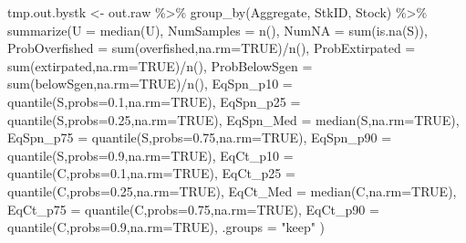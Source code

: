 \documentclass[french,11pt]{book}
\newenvironment{Shaded}{\begin{snugshade}}{\end{snugshade}}
\newcommand{\AttributeTok}[1]{\textcolor[rgb]{0.77,0.63,0.00}{#1}}
\newcommand{\ConstantTok}[1]{\textcolor[rgb]{0.00,0.00,0.00}{#1}}
\newcommand{\FloatTok}[1]{\textcolor[rgb]{0.00,0.00,0.81}{#1}}
\newcommand{\FunctionTok}[1]{\textcolor[rgb]{0.00,0.00,0.00}{#1}}
\newcommand{\NormalTok}[1]{#1}
\newcommand{\OtherTok}[1]{\textcolor[rgb]{0.56,0.35,0.01}{#1}}
\newcommand{\SpecialCharTok}[1]{\textcolor[rgb]{0.00,0.00,0.00}{#1}}
\newcommand{\StringTok}[1]{\textcolor[rgb]{0.31,0.60,0.02}{#1}}
\begin{document}
\begin{Shaded}
\begin{Highlighting}[]
\NormalTok{  tmp.out.bystk }\OtherTok{\textless{}{-}}\NormalTok{ out.raw }\SpecialCharTok{\%\textgreater{}\%} \FunctionTok{group\_by}\NormalTok{(Aggregate, StkID, Stock) }\SpecialCharTok{\%\textgreater{}\%}
    \FunctionTok{summarize}\NormalTok{(}\AttributeTok{U =} \FunctionTok{median}\NormalTok{(U),}
              \AttributeTok{NumSamples =}  \FunctionTok{n}\NormalTok{(),}
              \AttributeTok{NumNA =} \FunctionTok{sum}\NormalTok{(}\FunctionTok{is.na}\NormalTok{(S)),}
              \AttributeTok{ProbOverfished =} \FunctionTok{sum}\NormalTok{(overfished,}\AttributeTok{na.rm=}\ConstantTok{TRUE}\NormalTok{)}\SpecialCharTok{/}\FunctionTok{n}\NormalTok{(),}
              \AttributeTok{ProbExtirpated =} \FunctionTok{sum}\NormalTok{(extirpated,}\AttributeTok{na.rm=}\ConstantTok{TRUE}\NormalTok{)}\SpecialCharTok{/}\FunctionTok{n}\NormalTok{(),}
              \AttributeTok{ProbBelowSgen =} \FunctionTok{sum}\NormalTok{(belowSgen,}\AttributeTok{na.rm=}\ConstantTok{TRUE}\NormalTok{)}\SpecialCharTok{/}\FunctionTok{n}\NormalTok{(),}
              \AttributeTok{EqSpn\_p10 =} \FunctionTok{quantile}\NormalTok{(S,}\AttributeTok{probs=}\FloatTok{0.1}\NormalTok{,}\AttributeTok{na.rm=}\ConstantTok{TRUE}\NormalTok{),}
              \AttributeTok{EqSpn\_p25 =} \FunctionTok{quantile}\NormalTok{(S,}\AttributeTok{probs=}\FloatTok{0.25}\NormalTok{,}\AttributeTok{na.rm=}\ConstantTok{TRUE}\NormalTok{),}
              \AttributeTok{EqSpn\_Med =} \FunctionTok{median}\NormalTok{(S,}\AttributeTok{na.rm=}\ConstantTok{TRUE}\NormalTok{),}
              \AttributeTok{EqSpn\_p75 =} \FunctionTok{quantile}\NormalTok{(S,}\AttributeTok{probs=}\FloatTok{0.75}\NormalTok{,}\AttributeTok{na.rm=}\ConstantTok{TRUE}\NormalTok{),}
              \AttributeTok{EqSpn\_p90 =} \FunctionTok{quantile}\NormalTok{(S,}\AttributeTok{probs=}\FloatTok{0.9}\NormalTok{,}\AttributeTok{na.rm=}\ConstantTok{TRUE}\NormalTok{),}
              \AttributeTok{EqCt\_p10 =} \FunctionTok{quantile}\NormalTok{(C,}\AttributeTok{probs=}\FloatTok{0.1}\NormalTok{,}\AttributeTok{na.rm=}\ConstantTok{TRUE}\NormalTok{),}
              \AttributeTok{EqCt\_p25 =} \FunctionTok{quantile}\NormalTok{(C,}\AttributeTok{probs=}\FloatTok{0.25}\NormalTok{,}\AttributeTok{na.rm=}\ConstantTok{TRUE}\NormalTok{),}
              \AttributeTok{EqCt\_Med =} \FunctionTok{median}\NormalTok{(C,}\AttributeTok{na.rm=}\ConstantTok{TRUE}\NormalTok{),}
              \AttributeTok{EqCt\_p75 =} \FunctionTok{quantile}\NormalTok{(C,}\AttributeTok{probs=}\FloatTok{0.75}\NormalTok{,}\AttributeTok{na.rm=}\ConstantTok{TRUE}\NormalTok{),}
              \AttributeTok{EqCt\_p90 =} \FunctionTok{quantile}\NormalTok{(C,}\AttributeTok{probs=}\FloatTok{0.9}\NormalTok{,}\AttributeTok{na.rm=}\ConstantTok{TRUE}\NormalTok{),}
              \AttributeTok{.groups =} \StringTok{"keep"}
\NormalTok{    )}


\end{Highlighting}
\end{Shaded}
\end{document}
